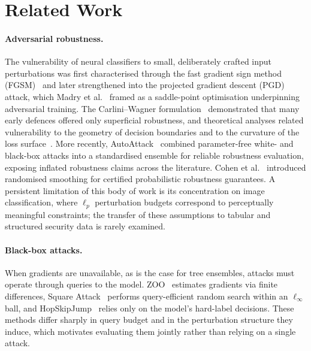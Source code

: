 \documentclass[runningheads]{llncs}
\begin{document}
\section{Related Work}
\label{sec:related}

\paragraph{Adversarial robustness.}
The vulnerability of neural classifiers to small, deliberately crafted input
perturbations was first characterised through the fast gradient sign method
(FGSM)~\cite{goodfellow2015explaining} and later strengthened into the projected
gradient descent (PGD) attack, which Madry et al.~\cite{madry2018towards} framed
as a saddle-point optimisation underpinning adversarial training.  The
Carlini--Wagner formulation~\cite{carlini2017towards} demonstrated that many
early defences offered only superficial robustness, and theoretical analyses
related vulnerability to the geometry of decision boundaries and to the curvature
of the loss surface~\cite{fawzi2018analysis}.  More recently, AutoAttack~\cite{croce2020autoattack}
combined parameter-free white- and black-box attacks into a standardised ensemble
for reliable robustness evaluation, exposing inflated robustness claims across
the literature.  Cohen et al.~\cite{cohen2019certified} introduced randomised
smoothing for certified probabilistic robustness guarantees.  A persistent
limitation of this body of work is its concentration on image classification,
where $\ell_p$ perturbation budgets correspond to perceptually meaningful
constraints; the transfer of these assumptions to tabular and structured security
data is rarely examined.

\paragraph{Black-box attacks.}
When gradients are unavailable, as is the case for tree ensembles, attacks must
operate through queries to the model.  ZOO~\cite{chen2017zoo} estimates gradients
via finite differences, Square Attack~\cite{andriushchenko2020square} performs
query-efficient random search within an $\ell_\infty$ ball, and
HopSkipJump~\cite{chen2020hopskipjump} relies only on the model's hard-label
decisions.  These methods differ sharply in query budget and in the perturbation
structure they induce, which motivates evaluating them jointly rather than
relying on a single attack.
\end{document}
